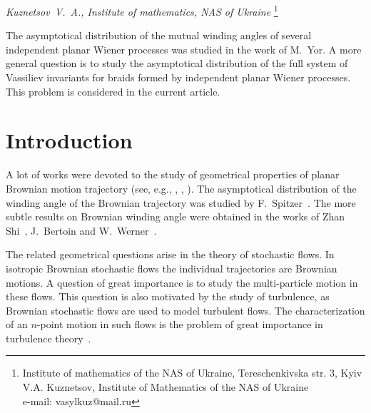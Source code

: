 \documentclass[12pt, a4paper, titlepage]{article}
\begin{document}
\newtheorem{theorem}{Theorem}
\newtheorem{statement}{Statement}
\newtheorem{proposition}{Proposition}
\newtheorem{definition}{Definition}
\newtheorem{lem}{Lemma}
\newtheorem{example}{Example}
\newtheorem{remark}{Remark}

{\it\large Kuznetsov~V.~A., Institute of mathematics, NAS of Ukraine}
\footnote{Institute of mathematics of the NAS of Ukraine, Tereschenkivska str. 3, Kyiv\\
V.A. Kuznetsov, Institute of Mathematics of the NAS of Ukraine \\
e-mail: vasylkuz@mail.ru}
\vspace{30pt}

The asymptotical distribution of the mutual winding angles of several independent planar Wiener processes
was studied in the work of M.~Yor. A more general question is to study the asymptotical distribution
of the full system of Vassiliev invariants for braids formed by independent planar Wiener processes.
This problem is considered in the current article. 

\section{Introduction}
\label{Introduction}

A lot of works were devoted to the study of geometrical properties 
of planar Brownian motion trajectory
(see, e.g., \cite{HausdorffCutPoints}, \cite{WernerHausdorff}, \cite{CranstonHsu}).
The asymptotical distribution of the winding angle of the Brownian trajectory
was studied by F.~Spitzer~\cite{Spitzer}. The more subtle results on Brownian
winding angle were obtained in the works of 
Zhan Shi~\cite{ZhanShi}, J.~Bertoin and W.~Werner~\cite{BertoinWerner}. 

The related geometrical questions arise in the theory of stochastic flows. 
In isotropic Brownian stochastic flows the individual trajectories are 
Brownian motions. A question of great importance is to study 
the multi-particle motion in these flows. This question is also motivated
by the study of turbulence, as Brownian stochastic flows are used to model turbulent flows.
The characterization of an $n$-point motion in such flows is
the problem of great importance in turbulence theory~\cite{Falkovich}. 
\end{document}
